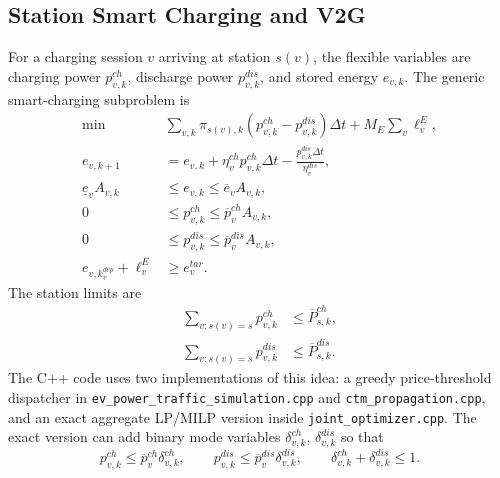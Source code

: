 \subsection{Station Smart Charging and V2G}
\label{sec:evpt-sessions}

For a charging session \(v\) arriving at station \(s(v)\), the flexible
variables are charging power \(p^{ch}_{v,k}\), discharge power
\(p^{dis}_{v,k}\), and stored energy \(e_{v,k}\). The generic smart-charging
subproblem is
\begin{align}
  \min \quad
  &\sum_{v,k}\pi_{s(v),k}\left(p^{ch}_{v,k}-p^{dis}_{v,k}\right)\Delta t
    + M_E\sum_v \ell^E_v,
    \label{eq:evpt-smart-obj} \\
  e_{v,k+1}
  &=e_{v,k}+\eta^{ch}_v p^{ch}_{v,k}\Delta t
      -\frac{p^{dis}_{v,k}\Delta t}{\eta^{dis}_v},
    \label{eq:evpt-smart-energy} \\
  \underline e_v A_{v,k}
  &\le e_{v,k}\le \overline e_v A_{v,k},
    \label{eq:evpt-smart-soc} \\
  0&\le p^{ch}_{v,k}\le \overline p^{ch}_v A_{v,k},
    \label{eq:evpt-smart-ub-ch} \\
  0&\le p^{dis}_{v,k}\le \overline p^{dis}_v A_{v,k},
    \label{eq:evpt-smart-ub-dis} \\
  e_{v,k^{dep}_v}+\ell^E_v&\ge e^{tar}_v.
    \label{eq:evpt-smart-slack}
\end{align}
The station limits are
\begin{align}
  \sum_{v:s(v)=s} p^{ch}_{v,k} &\le \overline P^{ch}_{s,k},
    \label{eq:evpt-station-charge} \\
  \sum_{v:s(v)=s} p^{dis}_{v,k} &\le \overline P^{dis}_{s,k}.
    \label{eq:evpt-station-discharge}
\end{align}
The C++ code uses two implementations of this idea: a greedy price-threshold
dispatcher in \texttt{ev\_power\_traffic\_simulation.cpp} and
\texttt{ctm\_propagation.cpp}, and an exact aggregate LP/MILP version inside
\texttt{joint\_optimizer.cpp}. The exact version can add binary mode variables
\(\delta^{ch}_{v,k}\), \(\delta^{dis}_{v,k}\) so that
\begin{equation}
  p^{ch}_{v,k}\le \overline p^{ch}_v\delta^{ch}_{v,k},\qquad
  p^{dis}_{v,k}\le \overline p^{dis}_v\delta^{dis}_{v,k},\qquad
  \delta^{ch}_{v,k}+\delta^{dis}_{v,k}\le 1.
  \label{eq:evpt-charge-discharge-mode}
\end{equation}


